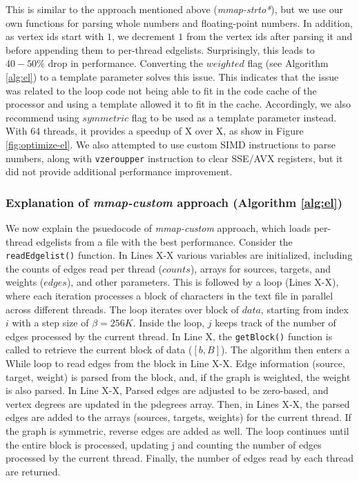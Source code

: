This is similar to the approach mentioned above (\textit{mmap-strto*}), but we use our own functions for parsing whole numbers and floating-point numbers. In addition, as vertex ids start with $1$, we decrement $1$ from the vertex ids after parsing it and before appending them to per-thread edgelists. Surprisingly, this leads to $40-50\%$ drop in performance. Converting the $weighted$ flag (see Algorithm \ref{alg:el}) to a template parameter solves this issue. This indicates that the issue was related to the loop code not being able to fit in the code cache of the processor and using a template allowed it to fit in the cache. Accordingly, we also recommend using $symmetric$ flag to be used as a template parameter instead. With 64 threads, it provides a speedup of X over X, as show in Figure \ref{fig:optimize-el}. We also attempted to use custom SIMD instructions to parse numbers, along with \texttt{vzeroupper} instruction to clear SSE/AVX registers, but it did not provide additional performance improvement.


\subsubsection{Explanation of \textit{mmap-custom} approach (Algorithm \ref{alg:el})}

We now explain the psuedocode of \textit{mmap-custom} approach, which loads per-thread edgelists from a file with the best performance. Consider the \texttt{readEdgelist()} function. In Lines X-X various variables are initialized, including the counts of edges read per thread ($counts$), arrays for sources, targets, and weights ($edges$), and other parameters. This is followed by a loop (Lines X-X), where each iteration processes a block of characters in the text file in parallel across different threads. The loop iterates over block of $data$, starting from index $i$ with a step size of $\beta = 256K$. Inside the loop, $j$ keeps track of the number of edges processed by the current thread. In Line X, the \texttt{getBlock()} function is called to retrieve the current block of data ($[b, B]$). The algorithm then enters a While loop to read edges from the block in Line X-X. Edge information (source, target, weight) is parsed from the block, and, if the graph is weighted, the weight is also parsed. In Line X-X, Parsed edges are adjusted to be zero-based, and vertex degrees are updated in the pdegrees array. Then, in Lines X-X, the parsed edges are added to the arrays (sources, targets, weights) for the current thread. If the graph is symmetric, reverse edges are added as well. The loop continues until the entire block is processed, updating j and counting the number of edges processed by the current thread. Finally, the number of edges read by each thread are returned.

